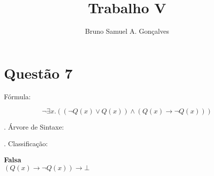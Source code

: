 \documentclass[12pt]{article}
\title{Trabalho V}
\author{Bruno Samuel A. Gonçalves}
\date{}
\begin{document}
\maketitle
\thispagestyle{empty}

\section{Questão 7}

\noindent Fórmula:

\[
    \neg \exists x. ((\neg Q(x) \lor Q(x)) \land (Q(x) \to \neg Q(x)))
\]

. Árvore de Sintaxe:

\begin{center}
\end{center}

. Classificação:

\begin{center}
    \textbf{Falsa} \\
    $(Q(x) \to \neg Q(x)) \to \bm{\bot}$
\end{center}
\end{document}
